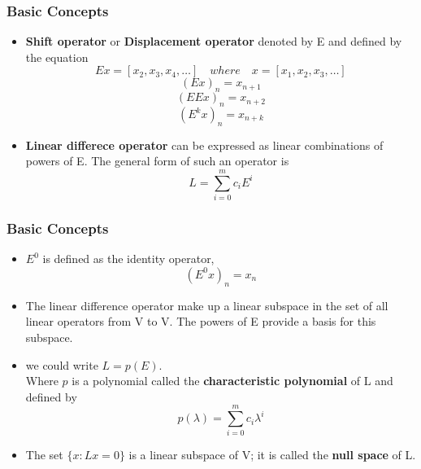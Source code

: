 \documentclass[notheorems,mathserif,table,compress]{beamer}  %
\begin{document}
\begin{frame}
\frametitle{Basic  Concepts}
\begin{itemize}
\item  \textbf{Shift operator} or \textbf{Displacement operator} denoted by E and  defined by the equation 
\begin{displaymath}
Ex=[x_{2}, x_{3}, x_{4},\ldots]\quad where\quad x=[x_{1}, x_{2}, x_{3},\ldots]
\end{displaymath}
\begin{displaymath}
(Ex)_n =x_{n+1} 
\end{displaymath}
\begin{displaymath}
(EEx)_n = x_{n+2}
\end{displaymath}
\begin{displaymath}
({E^k}x)_n = x_{n+k}
\end{displaymath}
\item \textbf{Linear differece operator} can be expressed  as linear combinations of powers of E. The general form  of  such an operator is
\begin{displaymath}
L=\sum_{i=0}^m c_{i}E^{i}  
\end{displaymath}
\end{itemize}
\end{frame}


\begin{frame}
\frametitle{Basic Concepts}
\begin{itemize}
\item  $E^0$ is defined  as the identity operator, 
\begin{displaymath}
(E^{0}x)_{n}=x_{n}
\end{displaymath}
\item  The linear difference operator make up a linear subspace in the set of all linear  operators from V to V. The powers of E provide a basis  for this  subspace.
\item we could write  $L=p(E)$. \\
Where $p$ is a polynomial called the \textbf{characteristic polynomial} of L and defined by
\begin{displaymath}
p(\lambda)=\sum_{i=0}^m c_{i}\lambda^{i}  
\end{displaymath}
\item The set $\{x:Lx=0\}$ is a linear subspace of V; it is called the  \textbf{null space} of L. 
\end{itemize}
\end{frame}

\end{document}
